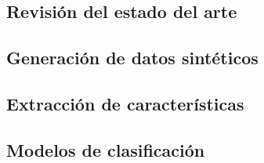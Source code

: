 \subsection{Revisión del estado del arte}
\subsection{Generación de datos sintéticos}
\subsection{Extracción de características}
\subsection{Modelos de clasificación}
\subsection{}